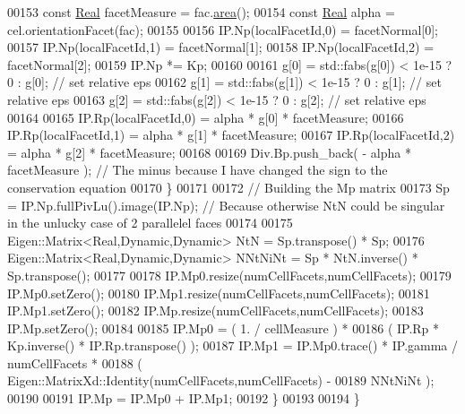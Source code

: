\begin{DoxyCode}
00153                 \textcolor{keyword}{const} \hyperlink{namespaceFVCode3D_a40c1f5588a248569d80aa5f867080e83}{Real} facetMeasure       = fac.\hyperlink{classFVCode3D_1_1Rigid__Mesh_1_1Facet_a19b2922eb0458019c8f34b40f0517789}{area}();
00154                 \textcolor{keyword}{const} \hyperlink{namespaceFVCode3D_a40c1f5588a248569d80aa5f867080e83}{Real} alpha              = cel.orientationFacet(fac);
00155             
00156                 IP.Np(localFacetId,0) = facetNormal[0];
00157                 IP.Np(localFacetId,1) = facetNormal[1];
00158                 IP.Np(localFacetId,2) = facetNormal[2];
00159                 IP.Np *= Kp;
00160 
00161                 g[0] = std::fabs(g[0]) < 1e-15 ? 0 : g[0];          \textcolor{comment}{// set relative eps}
00162                 g[1] = std::fabs(g[1]) < 1e-15 ? 0 : g[1];          \textcolor{comment}{// set relative eps}
00163                 g[2] = std::fabs(g[2]) < 1e-15 ? 0 : g[2];          \textcolor{comment}{// set relative eps}
00164 
00165                 IP.Rp(localFacetId,0) = alpha * g[0] * facetMeasure;
00166                 IP.Rp(localFacetId,1) = alpha * g[1] * facetMeasure;
00167                 IP.Rp(localFacetId,2) = alpha * g[2] * facetMeasure;
00168                 
00169                 Div.Bp.push\_back( - alpha * facetMeasure );    \textcolor{comment}{// The minus because I have changed the sign
       to the conservation equation}
00170         \}
00171 
00172         \textcolor{comment}{// Building the Mp matrix}
00173         Sp = IP.Np.fullPivLu().image(IP.Np);    \textcolor{comment}{// Because otherwise NtN could be singular in the unlucky
       case of 2 parallelel faces}
00174 
00175         Eigen::Matrix<Real,Dynamic,Dynamic> NtN = Sp.transpose() * Sp;
00176         Eigen::Matrix<Real,Dynamic,Dynamic> NNtNiNt = Sp * NtN.inverse() * Sp.transpose();
00177 
00178         IP.Mp0.resize(numCellFacets,numCellFacets);
00179         IP.Mp0.setZero();
00180         IP.Mp1.resize(numCellFacets,numCellFacets);
00181         IP.Mp1.setZero();
00182         IP.Mp.resize(numCellFacets,numCellFacets);
00183         IP.Mp.setZero();
00184         
00185         IP.Mp0 = ( 1. / cellMeasure ) *
00186                 ( IP.Rp * Kp.inverse() * IP.Rp.transpose() );
00187         IP.Mp1 = IP.Mp0.trace() * IP.gamma / numCellFacets *
00188                 ( Eigen::MatrixXd::Identity(numCellFacets,numCellFacets) -
00189                         NNtNiNt );
00190 
00191         IP.Mp  = IP.Mp0 + IP.Mp1;
00192 \}       
00193 
00194 \}
\end{DoxyCode}
